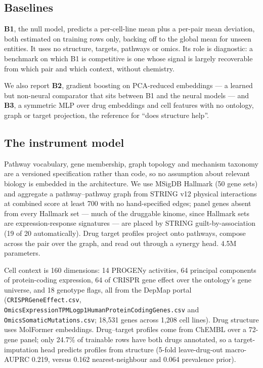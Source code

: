 \documentclass{ws-procs11x85}
\begin{document}
\subsection{Baselines}

\textbf{B1}, the null model, predicts a per-cell-line mean plus a per-pair mean
deviation, both estimated on training rows only, backing off to the global mean
for unseen entities. It uses no structure, targets, pathways or omics. Its role
is diagnostic: a benchmark on which B1 is competitive is one whose signal is
largely recoverable from which pair and which context, without chemistry.

We also report \textbf{B2}, gradient boosting on PCA-reduced embeddings --- a
learned but non-neural comparator that sits between B1 and the neural models ---
and \textbf{B3}, a symmetric MLP over drug embeddings and cell features with no
ontology, graph or target projection, the reference for ``does structure help''.

\subsection{The instrument model}

Pathway vocabulary, gene membership, graph topology and mechanism taxonomy are a
versioned specification rather than code, so no assumption about relevant biology
is embedded in the architecture. We use MSigDB Hallmark (50 gene
sets)\cite{liberzon2015} and aggregate a pathway--pathway graph from STRING v12
physical interactions at combined score at least 700\cite{szklarczyk2023} with no
hand-specified edges; panel genes absent from every Hallmark set --- much of the
druggable kinome, since Hallmark sets are expression-response signatures --- are
placed by STRING guilt-by-association (19 of 20 automatically). Drug target
profiles project onto pathways, compose across the pair over the graph, and read
out through a synergy head. 4.5M parameters.

Cell context is 160 dimensions: 14 PROGENy activities,\cite{schubert2018} 64
principal components of protein-coding expression, 64 of CRISPR gene effect over
the ontology's gene universe, and 18 genotype flags, all from the DepMap
portal\cite{tsherniak2017} ({\tt CRISPRGeneEffect.csv}, {\tt
OmicsExpressionTPMLogp1HumanProteinCodingGenes.csv} and {\tt
OmicsSomaticMutations.csv}; 18,531 genes across 1,208 cell lines). Drug structure
uses MolFormer embeddings.\cite{ross2022} Drug--target profiles come from ChEMBL\cite{zdrazil2024}
over a 72-gene panel; only 24.7\% of trainable rows have both drugs annotated, so
a target-imputation head predicts profiles from structure (5-fold leave-drug-out
macro-AUPRC 0.219, versus 0.162 nearest-neighbour and 0.064 prevalence prior).
\end{document}
